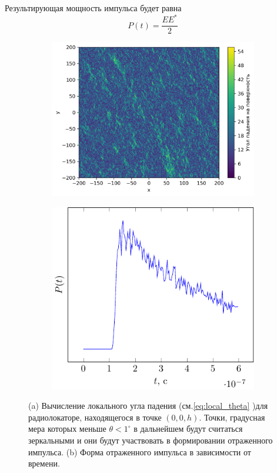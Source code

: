  Результирующая мощность импульса будет равна
 \begin{equation}
     \label{eq:}
     P(t) = \frac{EE^*}{2}
 \end{equation}
 \begin{figure}[h]
     \begin{subfigure}{.55\linewidth}
         \centering
         \includegraphics[width=\linewidth]{fig/theta0}
         \caption{}
     \end{subfigure}
     \hfill
     \begin{subfigure}{.39\linewidth}
         \centering
         \includegraphics[width=\linewidth]{fig/theta.pdf}
         \caption{}
     \end{subfigure}
     \caption{(a) Вычисление локального угла падения (см.\eqref{eq:local_theta} )для радиолокаторе,
     находящегося в точке $(0,0,h)$.  Точки, градусная мера которых меньше
     $\theta<1^\circ$ в 
 дальнейшем будут считаться зеркальными и они будут участвовать в
 формировании отраженного импульса.
 (b) Форма отраженного импульса в зависимости от времени.}
    \label{fig:model_impuls}
 \end{figure}


